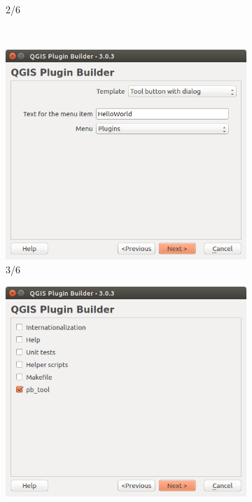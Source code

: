 \documentclass[11pt]{article}
\begin{document}
\begin{enumerate}
\begin{minipage}[t]{0.9\paperwidth}
\begin{figure}[H]
\begin{subfigure}[t]{0.32\textwidth}
        \caption{2/6}\label{pluginbuilder:2}
    \end{subfigure}
    ~
    \begin{subfigure}[t]{0.32\textwidth}
        \centering
        \includegraphics[width=1\textwidth]{pluginbuilder3_3.png}
        \caption{3/6}\label{pluginbuilder:3}
    \end{subfigure}
    \begin{subfigure}[t]{0.32\textwidth}
		\centering
        \includegraphics[width=1\textwidth]{pluginbuilder3_4.png}

\end{subfigure}
\end{figure}
\end{minipage}
\end{enumerate}
\end{document}
